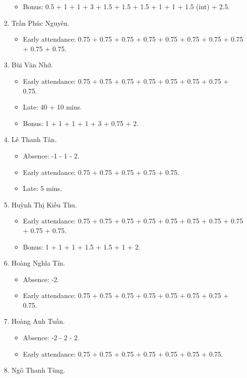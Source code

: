 \documentclass{article}
\begin{document}
\begin{enumerate}
\begin{itemize}
		\item Bonus: 0.5 + 1 + 1 + 3 + 1.5 + 1.5 + 1.5 + 1 + 1 + 1.5 (int) + 2.5.
	\end{itemize}
	\item {\sc Trần Phúc Nguyên.}
	\begin{itemize}
		\item Early attendance: 0.75 + 0.75 + 0.75 + 0.75 + 0.75 + 0.75 + 0.75 + 0.75 + 0.75 + 0.75.
	\end{itemize}
	\item {\sc Bùi Văn Nhớ.}
	\begin{itemize}
		\item Early attendance: 0.75 + 0.75 + 0.75 + 0.75 + 0.75 + 0.75 + 0.75 + 0.75.
		\item Late: 40 + 10 mins.
		\item Bonus: 1 + 1 + 1 + 1 + 3 + 0.75 + 2.
	\end{itemize}
	\item {\sc Lê Thanh Tân.}
	\begin{itemize}
		\item Absence: -1 - 1 - 2.
		\item Early attendance: 0.75 + 0.75 + 0.75 + 0.75 + 0.75.
		\item Late: 5 mins.
	\end{itemize}
	\item {\sc Huỳnh Thị Kiều Thu.}
	\begin{itemize}
		\item Early attendance: 0.75 + 0.75 + 0.75 + 0.75 + 0.75 + 0.75 + 0.75 + 0.75 + 0.75 + 0.75.
		\item Bonus: 1 + 1 + 1 + 1.5 + 1.5 + 1 + 2.
	\end{itemize}
	\item {\sc Hoàng Nghĩa Tín.}
	\begin{itemize}
        \item Absence: -2.
		\item Early attendance: 0.75 + 0.75 + 0.75 + 0.75 + 0.75 + 0.75 + 0.75 + 0.75.
	\end{itemize}
	\item {\sc Hoàng Anh Tuấn.}
	\begin{itemize}
		\item Absence: -2 - 2 - 2.
		\item Early attendance: 0.75 + 0.75 + 0.75 + 0.75 + 0.75 + 0.75 + 0.75.
	\end{itemize}
	\item {\sc Ngô Thanh Tùng.}
	\begin{itemize}

\end{itemize}
\end{enumerate}
\end{document}
